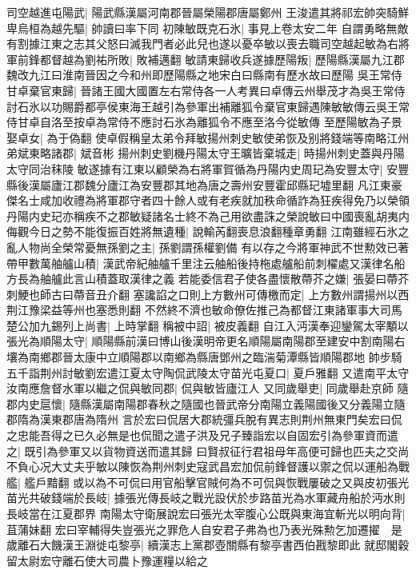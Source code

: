 司空越進屯陽武|{
	陽武縣漢屬河南郡晉屬榮陽郡唐屬鄭州}
王浚遣其將祁宏帥突騎鮮卑烏桓為越先驅|{
	帥讀曰率下同}
初陳敏既克石氷|{
	事見上卷太安二年}
自謂勇略無敵有割據江東之志其父怒曰滅我門者必此兒也遂以憂卒敏以喪去職司空越起敏為右將軍前鋒都督越為劉祐所敗|{
	敗補邁翻}
敏請東歸收兵遂據歷陽叛|{
	歷陽縣漢屬九江郡魏改九江曰淮南晉因之今和州即歷陽縣之地宋白曰縣南有歷水故曰歷陽}
吳王常侍甘卓棄官東歸|{
	晉諸王國大國置左右常侍各一人考異曰卓傳云州舉茂才為吳王常侍討石氷以功賜爵都亭侯東海王越引為參軍出補離狐令棄官東歸遇陳敏敏傳云吳王常侍甘卓自洛至按卓為常侍不應討石氷為離狐令不應至洛今從敏傳}
至歷陽敏為子景娶卓女|{
	為于偽翻}
使卓假稱皇太弟令拜敏揚州刺史敏使弟恢及别將錢端等南略江州弟斌東略諸郡|{
	斌音彬}
揚州刺史劉機丹陽太守王曠皆棄城走|{
	時揚州刺史蓋與丹陽太守同治秣陵}
敏遂據有江東以顧榮為右將軍賀循為丹陽内史周玘為安豐太守|{
	安豐縣後漢屬廬江郡魏分廬江為安豐郡其地為唐之壽州安豐霍邱縣玘墟里翻}
凡江東豪傑名士咸加收禮為將軍郡守者四十餘人或有老疾就加秩命循詐為狂疾得免乃以榮領丹陽内史玘亦稱疾不之郡敏疑諸名士終不為己用欲盡誅之榮說敏曰中國喪亂胡夷内侮觀今日之勢不能復振百姓將無遺種|{
	說輸芮翻喪息浪翻種章勇翻}
江南雖經石氷之亂人物尚全榮常憂無孫劉之主|{
	孫劉謂孫權劉備}
有以存之今將軍神武不世勲效已著帶甲數萬舳艫山積|{
	漢武帝紀舳艫千里注云舳船後持柂處艫船前刺櫂處又漢律名船方長為舳艫此言山積蓋取漢律之義}
若能委信君子使各盡懷散蔕芥之嫌|{
	張晏曰蔕芥刺鯁也師古曰蔕音丑介翻}
塞讒諂之口則上方數州可傳檄而定|{
	上方數州謂揚州以西荆江豫梁益等州也塞悉則翻}
不然終不濟也敏命僚佐推己為都督江東諸軍事大司馬楚公加九錫列上尚書|{
	上時掌翻}
稱被中詔|{
	被皮義翻}
自江入沔漢奉迎鑾駕太宰顒以張光為順陽太守|{
	順陽縣前漢曰博山後漢明帝更名順陽屬南陽郡至建安中割南陽右壤為南鄉郡晉太康中立順陽郡以南鄉為縣唐鄧州之臨湍菊潭縣皆順陽郡地}
帥步騎五千詣荆州討敏劉宏遣江夏太守陶侃武陵太守苗光屯夏口|{
	夏戶雅翻}
又遣南平太守汝南應詹督水軍以繼之侃與敏同郡|{
	侃與敏皆廬江人}
又同歲舉吏|{
	同歲舉赴京師}
隨郡内史扈懷|{
	隨縣漢屬南陽郡春秋之隨國也晉武帝分南陽立義陽國後又分義陽立隨郡隋為漢東郡唐為隋州}
言於宏曰侃居大郡統彊兵脫有異志則荆州無東門矣宏曰侃之忠能吾得之已久必無是也侃聞之遣子洪及兄子臻詣宏以自固宏引為參軍資而遣之|{
	既引為參軍又以貨物資送而遣其歸}
曰賢叔征行君祖母年高便可歸也匹夫之交尚不負心况大丈夫乎敏以陳恢為荆州刺史寇武昌宏加侃前鋒督護以禦之侃以運船為戰艦|{
	艦戶黯翻}
或以為不可侃曰用官船擊官賊何為不可侃與恢戰屢破之又與皮初張光苗光共破錢端於長岐|{
	據張光傳長岐之戰光設伏於步路苗光為水軍藏舟船於沔水則長岐當在江夏郡界}
南陽太守衛展說宏曰張光太宰腹心公既與東海宜斬光以明向背|{
	苴蒲妹翻}
宏曰宰輔得失豈張光之罪危人自安君子弗為也乃表光殊勲乞加遷擢　是歲離石大饑漢王淵徙屯黎亭|{
	續漢志上黨郡壺關縣有黎亭書西伯戡黎即此}
就邸閣穀留太尉宏守離石使大司農卜豫運糧以給之

